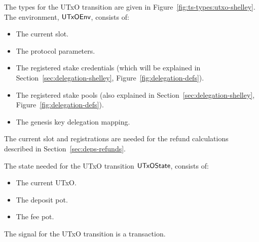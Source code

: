 The types for the UTxO transition are given in Figure~\ref{fig:ts-types:utxo-shelley}.
The environment, $\mathsf{UTxOEnv}$, consists of:

\begin{itemize}
  \item The current slot.
  \item The protocol parameters.
  \item The registered stake credentials (which will be explained in
    Section~\ref{sec:delegation-shelley}, Figure~\ref{fig:delegation-defs}).
  \item The registered stake pools
    (also explained in Section~\ref{sec:delegation-shelley},
    Figure~\ref{fig:delegation-defs}).
  \item The genesis key delegation mapping.
\end{itemize}
The current slot and registrations are needed for the refund calculations
described in Section~\ref{sec:deps-refunds}.

The state needed for the UTxO transition $\mathsf{UTxOState}$, consists of:

\begin{itemize}
  \item The current UTxO.
  \item The deposit pot.
  \item The fee pot.
\end{itemize}
The signal for the UTxO transition is a transaction.

